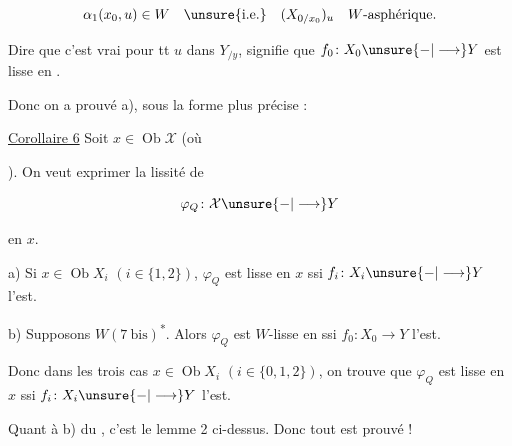 
\[
\alpha_1(x_0,u)\in W\quad\text{\unsure{i.e.}}\quad (X_{0/x_0})_u\quad W\text{-asphérique}.
\]

 Dire que c'est vrai pour tt $u$ dans  $Y_{/y}$, signifie que $f_0\colon X_0\unsure{-|\longrightarrow}Y$ est lisse en .

Donc on a prouvé a), sous la forme plus précise :

\uline{Corollaire 6}  Soit $x\in\operatorname{Ob}\mathcal X$ (où


). On veut exprimer la lissité de \deleted{\unsure{$\varphi$}}

\[
\varphi_Q\colon\mathcal X\unsure{-|\longrightarrow}Y
\]

en $x$.

a) Si $x\in\operatorname{Ob}X_i$ $(i\in\{1,2\})$, $\varphi_Q$ est lisse en $x$ ssi $f_i\colon X_i\unsure{-|\longrightarrow}Y$ l'est.

b) Supposons $W(7\ \mathrm{bis})$\textsuperscript{*}.   Alors $\varphi_Q$ est $W$-lisse en  ssi $f_0\colon X_0\longrightarrow Y$ l'est.


Donc  dans  les trois cas $x\in\operatorname{Ob}X_i$ $(i\in\{0,1,2\})$, on trouve que $\varphi_Q$ est lisse en $x$ ssi $f_i\colon X_i\unsure{-|\longrightarrow}Y$ l'est.

Quant à b) du ,  c'est le lemme 2 ci-dessus. Donc tout est prouvé !
